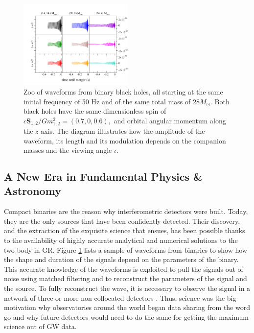 \documentclass[twocolumn,aps,prd,nofootinbib,superscriptaddress,10pt,notitlepage,preprintnumbers] {revtex4-1}
\begin{document}
\begin{figure} [bh]
\includegraphics[width=0.505\textwidth]{wavezoov2.pdf}
\caption{Zoo of waveforms from binary black holes, all starting at the same initial frequency of 50 Hz and of the same total mass of $28M_\odot.$ Both black holes have the same dimensionless spin of $c{\mathbf S}_{1,2} / Gm_{1,2}^2 = (0.7,0,0.6),$ and orbital angular momentum along the $z$ axis. The diagram illustrates how the amplitude of the waveform, its length and its modulation depends on the companion masses and the viewing angle $\iota$.}
\label{fig:wavezoo}
\vskip-0.5cm
\end{figure}

\subsection*{\bf A New Era in Fundamental Physics \& Astronomy}
Compact binaries are the reason why interferometric detectors were built. Today, they are the only sources that have been confidently detected. Their discovery, and the extraction of the exquisite science that ensues, has been possible thanks to the availability of highly accurate analytical \cite{Blanchet:1994ez, Buonanno:2000ef, Ajith:2009bn} and numerical \cite{Pretorius:2005gq, Campanelli:2005dd, Baker:2005vv} solutions to the two-body in GR. Figure \ref{fig:wavezoo} lists a sample of waveforms from binaries to show how the shape and duration of the signals depend on the parameters of the binary. This accurate knowledge of the waveforms is exploited to pull the signals out of noise using matched filtering \cite{Sathyaprakash:1991mt} and to reconstruct the parameters of the signal and the source. To fully reconstruct the wave, it is necessary to observe the signal in a network of three or more non-collocated detectors \cite{Sathyaprakash:2009xs}. Thus, science was the big motivation why observatories around the world began data sharing from the word go and why future detectors would need to do the same for getting the maximum science out of GW data. 
\end{document}
